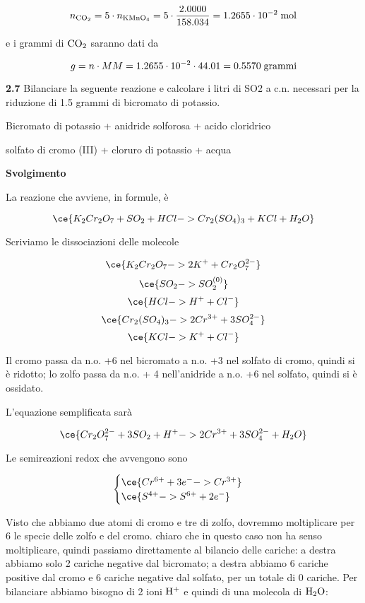 $$n_{\rm CO_2}=5 \cdot n_{\rm KMnO_4}
=5 \cdot \frac{2.0000}{158.034}
=1.2655 \cdot 10^{-2} \; \rm mol$$

e i grammi di $\rm CO_2$ saranno dati da

$$g=n \cdot MM=1.2655 \cdot 10^{-2} \cdot 44.01
=0.5570 \; \rm grammi$$

\vspace{0.2cm}\textbf{2.7} Bilanciare la seguente reazione e calcolare i litri di SO2 a c.n. necessari per la riduzione di 1.5
grammi di bicromato di potassio.

\begin{center}
    Bicromato di potassio + anidride solforosa + acido cloridrico \ce{->}

    \ce{->} solfato di cromo (III) + cloruro di potassio + acqua
\end{center}

\large\textbf{Svolgimento}\normalsize

\vspace{0.2cm}La reazione che avviene, in formule, è

$$\ce{K_2Cr_2O_7 + SO_2 + HCl -> Cr_2(SO_4)_3 + KCl + H_2O}$$

Scriviamo le dissociazioni delle molecole

$$\ce{K_2Cr_2O_7 -> 2K^+ + Cr_2O_7^{2-}}$$
$$\ce{SO_2 -> SO_2^{(0)}}$$
$$\ce{HCl -> H^+ + Cl^-}$$
$$\ce{Cr_2(SO_4)_3 -> 2Cr^{3+} + 3SO_4^{2-}}$$
$$\ce{KCl -> K^+ + Cl^-}$$

Il cromo passa da n.o. +6 nel bicromato a n.o. +3 nel solfato di cromo, quindi si è ridotto; lo zolfo passa da n.o. + 4 nell'anidride a n.o. +6 nel solfato, quindi si è ossidato.

L'equazione semplificata sarà

$$\ce{Cr_2O_7^{2-} + 3SO_2 + H^+ -> 2Cr^{3+} + 3SO_4^{2-} + H_2O}$$

Le semireazioni redox che avvengono sono

$$\begin{cases}
    \ce{Cr^{6+} +3e^- -> Cr^{3+}}\\
    \ce{S^{4+} -> S^{6+} +2e^-}
\end{cases}$$

Visto che abbiamo due atomi di cromo e tre di zolfo, dovremmo moltiplicare per 6 le specie delle zolfo e del cromo. \E chiaro che in questo caso non ha senso moltiplicare, quindi passiamo direttamente al bilancio delle cariche: a destra abbiamo solo 2 cariche negative dal bicromato; a destra abbiamo 6 cariche positive dal cromo e 6 cariche negative dal solfato, per un totale di 0 cariche. Per bilanciare abbiamo bisogno di 2 ioni $\rm H^+$ e quindi di una molecola di $\rm H_2O$:

